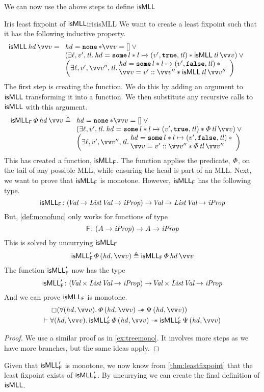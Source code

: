 \documentclass[thesis.tex]{subfiles}
\begin{document}
We can now use the above steps to define $\textsf{\upshape isMLL}$
\begin{example}{Iris least fixpoint of $\textsf{\upshape isMLL}$}{irisisMLL}
  We want to create a least fixpoint such that it has the following inductive property.
  \begin{align*}
    \isMLL\, \hd\, \vect{\val} & = \isMLLRecDef
  \end{align*}
  The first step is creating the function. We do this by adding an argument to $\textsf{\upshape isMLL}$ transforming it into a function. We then substitute any recursive calls to $\textsf{\upshape isMLL}$ with this argument.
  \begin{align*}
    \isMLL_\hopred\, \pred\, \hd\, \vect{v} & \eqdef
    \isMLLFDef
  \end{align*}
  This has created a function, $\textsf{\upshape isMLL}_{\textsf{\upshape F}}$. The function applies the predicate, $\varPhi$, on the tail of any possible MLL, while ensuring the head is part of an MLL. Next, we want to prove that $\textsf{\upshape isMLL}_{\textsf{\upshape F}}$ is monotone. However, $\textsf{\upshape isMLL}_{\textsf{\upshape F}}$ has the following type.
  \[\textsf{\upshape isMLL}_{\textsf{\upshape F}}\colon (\kern-0.2em\textit{Val} \to \textit{List}\ \kern-0.2em\textit{Val} \to \textit{iProp}) \to \kern-0.2em\textit{Val} \to \textit{List}\ \kern-0.2em\textit{Val} \to \textit{iProp}\]
  But, \cref{def:monofunc} only works for functions of type
  \[\textsf{\upshape F}\colon (A \to \textit{iProp}) \to A \to \textit{iProp}\]
  This is solved by uncurrying $\textsf{\upshape isMLL}_{\textsf{\upshape F}}$
  \begin{align*}
    \isMLL'_\hopred\, \pred\, (\hd, \vect{\val}) \eqdef \isMLL_\hopred\, \pred\, \hd\, \vect{\val}
  \end{align*}
  The function $\textsf{\upshape isMLL}'_{\textsf{\upshape F}}$ now has the type
  \[\textsf{\upshape isMLL}'_{\textsf{\upshape F}}\colon (\kern-0.2em\textit{Val} \times \textit{List}\ \kern-0.2em\textit{Val} \to \textit{iProp}) \to  \kern-0.2em\textit{Val} \times \textit{List}\ \kern-0.2em\textit{Val} \to \textit{iProp}\]
  And we can prove $\textsf{\upshape isMLL}_{\textsf{\upshape F}}$ is monotone.
  \begin{align*}
              & \always(\All(\hd, \vect{\val}). \pred\,(\hd, \vect{\val}) \wand \predB\,(\hd, \vect{\val}))                              \\
    \proves{} & \All(\hd, \vect{\val}). \isMLL'_\hopred\, \pred\, (\hd, \vect{\val}) \wand \isMLL'_\hopred\, \predB\, (\hd, \vect{\val})
  \end{align*}
  \begin{proof}
    We use a similar proof as in \cref{ex:treemono}. It involves more steps as we have more branches, but the same ideas apply.
  \end{proof}
  Given that $\textsf{\upshape isMLL}'_{\textsf{\upshape F}}$ is monotone, we now know from \cref{thm:leastfixpoint} that the least fixpoint exists of $\textsf{\upshape isMLL}'_{\textsf{\upshape F}}$. By uncurrying we can create the final definition of $\textsf{\upshape isMLL}$.

\end{example}
\end{document}
